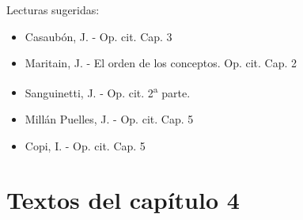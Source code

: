 \documentclass{article}
\begin{document}
\vspace*{\fill}

\noindent Lecturas sugeridas:
\begin{itemize}[label={$\bullet$}]
        \item Casaubón, J. - Op. cit. Cap. 3
        \item Maritain, J. - El orden de los conceptos. Op. cit. Cap. 2
        \item Sanguinetti, J. - Op. cit. 2\textsuperscript{a} parte.
        \item Millán Puelles, J. - Op. cit. Cap. 5
        \item Copi, I. - Op. cit. Cap. 5
\end{itemize}

\newpage

\section{Textos del capítulo 4}
\end{document}
